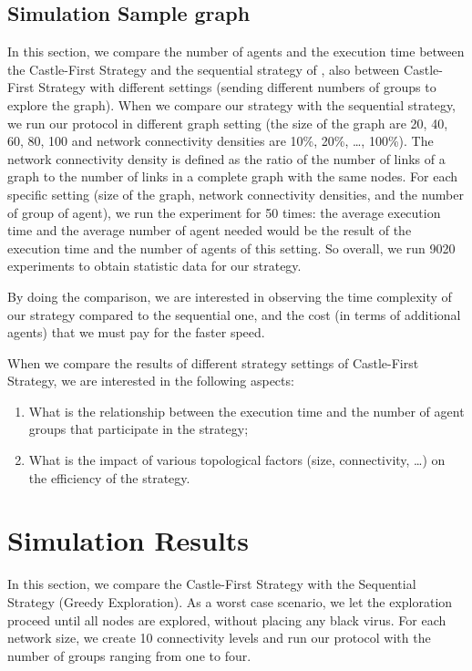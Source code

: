 \subsection{Simulation Sample graph} 
In this section, we compare the number of agents and the execution time between the {\sc Castle-First} Strategy and the sequential strategy of \cite{cai}, also between {\sc Castle-First} Strategy with different settings (sending different numbers of groups to explore the graph). When we compare our strategy with the sequential strategy, we run our protocol in different graph setting (the size of the graph are 20, 40, 60, 80, 100   and network connectivity densities are 10\%, 20\%, \ldots, 100\%). The network connectivity density is defined as the ratio of the number of links of a graph to the number of links in a complete graph with the same nodes. For each specific setting (size of the graph,   network connectivity densities, and the number of group of agent), we run the experiment for 50 times: the average execution time and the average number of agent needed would be the result of the execution time and the number of agents of this setting. So overall, we run 9020 experiments to obtain statistic data for our strategy.

By doing the comparison, we are interested in observing 
the time complexity of  our strategy   compared to the sequential one, and 
  the cost (in terms of additional agents) that we must pay for the faster speed.  

When we compare the results of different strategy settings of {\sc Castle-First} Strategy, we are interested in the following aspects: 
\begin{enumerate}
\item What is the relationship between the execution time and the number of agent groups that  participate in the strategy;
\item 
What is the impact of various topological factors (size,  connectivity, \ldots) on the efficiency of the strategy.
\end{enumerate}


\section{Simulation Results}
In this section, we compare the {\sc Castle-First} Strategy with the Sequential Strategy ({\sc Greedy} Exploration).
As a worst case scenario, we let the exploration proceed until all nodes are explored, without placing any black virus. 
For each network size, we create 10 connectivity levels and run our protocol with the number of groups ranging from one to four.


